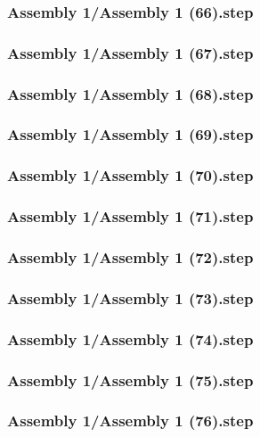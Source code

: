 \documentclass[a4paper,12pt]{article}
\begin{document}
\begin{lstlising}[language=C++]
\subsubsection{Assembly 1/Assembly 1 (66).step}

\subsubsection{Assembly 1/Assembly 1 (67).step}

\subsubsection{Assembly 1/Assembly 1 (68).step}

\subsubsection{Assembly 1/Assembly 1 (69).step}

\subsubsection{Assembly 1/Assembly 1 (70).step}

\subsubsection{Assembly 1/Assembly 1 (71).step}

\subsubsection{Assembly 1/Assembly 1 (72).step}

\subsubsection{Assembly 1/Assembly 1 (73).step}

\subsubsection{Assembly 1/Assembly 1 (74).step}

\subsubsection{Assembly 1/Assembly 1 (75).step}

\subsubsection{Assembly 1/Assembly 1 (76).step}


\end{lstlising}
\end{document}
